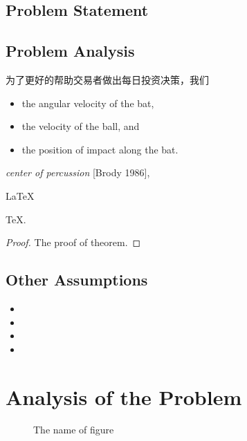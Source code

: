\documentclass{mcmthesis}
\begin{document}
\subsection{Problem Statement}



\subsection{Problem Analysis}
为了更好的帮助交易者做出每日投资决策，我们




\begin{itemize}
\item the angular velocity of the bat,
\item the velocity of the ball, and
\item the position of impact along the bat.
\end{itemize}
\lipsum[4]
\emph{center of percussion} [Brody 1986], \lipsum[5]

\begin{Theorem} \label{thm:latex}
\LaTeX
\end{Theorem}
\begin{Lemma} \label{thm:tex}
\TeX .
\end{Lemma}
\begin{proof}
The proof of theorem.
\end{proof}

\subsection{Other Assumptions}
\lipsum[6]
\begin{itemize}
\item
\item
\item
\item
\end{itemize}

\lipsum[7]

\section{Analysis of the Problem}

\begin{figure}[h]
\small
\centering
{}
\hfill
\centering
{}
\caption{The name of figure} \label{fig:aa}
\end{figure}
\end{document}

